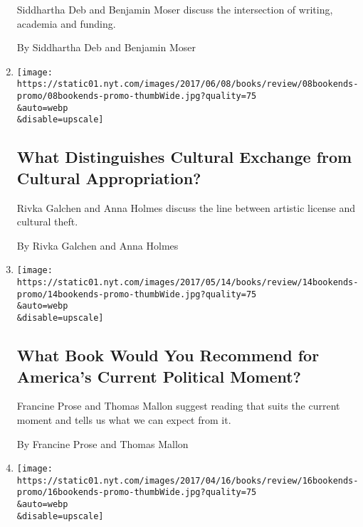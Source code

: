 \begin{enumerate}
  Siddhartha Deb and Benjamin Moser discuss the intersection of writing,
  academia and funding.

  By Siddhartha Deb and Benjamin Moser
\item
  \href{/2017/06/08/books/review/bookends-cultural-appropriation.html}{}

  \texttt{[image: https://static01.nyt.com/images/2017/06/08/books/review/08bookends-promo/08bookends-promo-thumbWide.jpg?quality=75\\\&auto=webp\\\&disable=upscale]}

  \hypertarget{what-distinguishes-cultural-exchange-from-cultural-appropriation}{%
  \subsection{What Distinguishes Cultural Exchange from Cultural
  Appropriation?}\label{what-distinguishes-cultural-exchange-from-cultural-appropriation}}

  Rivka Galchen and Anna Holmes discuss the line between artistic
  license and cultural theft.

  By Rivka Galchen and Anna Holmes
\item
  \href{/2017/05/11/books/review/what-book-would-you-recommend-for-americas-current-political-moment.html}{}

  \texttt{[image: https://static01.nyt.com/images/2017/05/14/books/review/14bookends-promo/14bookends-promo-thumbWide.jpg?quality=75\\\&auto=webp\\\&disable=upscale]}

  \hypertarget{what-book-would-you-recommend-for-americas-current-political-moment}{%
  \subsection{What Book Would You Recommend for America's Current
  Political
  Moment?}\label{what-book-would-you-recommend-for-americas-current-political-moment}}

  Francine Prose and Thomas Mallon suggest reading that suits the
  current moment and tells us what we can expect from it.

  By Francine Prose and Thomas Mallon
\item
  \href{/2017/04/13/books/review/which-force-is-more-harmful-to-the-arts-elitism-or-populism.html}{}

  \texttt{[image: https://static01.nyt.com/images/2017/04/16/books/review/16bookends-promo/16bookends-promo-thumbWide.jpg?quality=75\\\&auto=webp\\\&disable=upscale]}


\end{enumerate}
